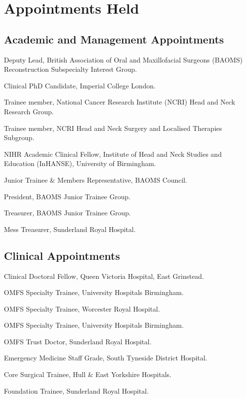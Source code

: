 \section*{Appointments Held}

\subsection*{Academic and Management Appointments}

 Deputy Lead, British Association of Oral and Maxillofacial Surgeons (BAOMS) Reconstruction Subspecialty Interest Group.

 Clinical PhD Candidate, Imperial College London.

 Trainee member, National Cancer Research Institute (NCRI) Head and Neck Research Group.

 Trainee member, NCRI Head and Neck Surgery and Localised Therapies Subgroup.

 NIHR Academic Clinical Fellow, Institute of Head and Neck Studies and Education (InHANSE), University of Birmingham.

 Junior Trainee \& Members Representative, BAOMS Council.

 President, BAOMS Junior Trainee Group.

 Treasurer, BAOMS Junior Trainee Group.

 Mess Treasurer, Sunderland Royal Hospital.


\subsection*{Clinical Appointments}

 Clinical Doctoral Fellow, Queen Victoria Hospital, East Grinstead.

 OMFS Specialty Trainee, University Hospitals Birmingham.

 OMFS Specialty Trainee, Worcester Royal Hospital.

 OMFS Specialty Trainee, University Hospitals Birmingham.

 OMFS Trust Doctor, Sunderland Royal Hospital.

 Emergency Medicine Staff Grade, South Tyneside District Hospital.

 Core Surgical Trainee, Hull \& East Yorkshire Hospitals.

 Foundation Trainee, Sunderland Royal Hospital.
